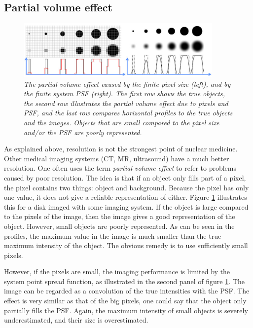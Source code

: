 \documentclass[11pt,oneside]{article}
\begin{document}
\subsection{Partial volume effect} \label{sec:pv}
\begin{figure}[tb]
\centering
\includegraphics[width=0.9\textwidth]{figs/fig_pv.pdf}
\caption{\label{fig:pv} \emph{The partial volume effect caused by the
finite pixel size (left), and by the finite system PSF (right). The
first row shows the true objects, the second row illustrates the
partial volume effect due to pixels and PSF, and the last row compares
horizontal profiles to the true objects and the images.  Objects that
are small compared to the pixel size and/or the PSF are poorly
represented.}}
\end{figure}
%
As explained above, resolution is not the strongest point of nuclear
medicine. Other medical imaging systems (CT, MR, ultrasound) have a
much better resolution. One often uses the term {\em partial volume
effect} to refer to problems caused by poor resolution. The idea is
that if an object only fills part of a pixel, the pixel contains two
things: object and background. Because the pixel has only one value,
it does not give a reliable representation of either. Figure
\ref{fig:pv} illustrates this for a disk imaged with some imaging
system. If the object is large compared to the pixels of the image,
then the image gives a good representation of the object. However,
small objects are poorly represented. As can be seen in the profiles,
the maximum value in the image is much smaller than the true maximum
intensity of the object. The obvious remedy is to use sufficiently
small pixels.

However, if the pixels are small, the imaging performance is limited
by the system point spread function, as illustrated in the second
panel of figure \ref{fig:pv}. The image can be regarded as a
convolution of the true intensities with the PSF. The effect is very
similar as that of the big pixels, one could say that the object only
partially fills the PSF. Again, the maximum intensity of small objects
is severely underestimated, and their size is overestimated.
\end{document}
